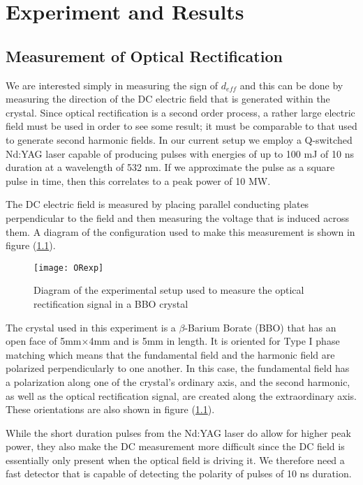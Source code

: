 \chapter{Experiment and Results}

\section{Measurement of Optical Rectification}

We are interested simply in measuring the sign of $d_{eff}$ and
this can be done by measuring the direction of the DC electric
field that is generated within the crystal.  Since optical
rectification is a second order process, a rather large electric
field must be used in order to see some result; it must be
comparable to that used to generate second harmonic fields.  In
our current setup we employ a Q-switched Nd:YAG laser capable of
producing pulses with energies of up to 100 mJ of 10 ns duration
at a wavelength of 532 nm. If we approximate the pulse as a square
pulse in time, then this correlates to a peak power of 10 MW.

The DC electric field is measured by placing parallel conducting
plates perpendicular to the field and then measuring the voltage
that is induced across them.  A diagram of the configuration used
to make this measurement is shown in figure (\ref{ORexp}).

\begin{figure}
\texttt{[image: ORexp]}
\caption[Optical rectification measurement apparatus]{Diagram of
the experimental setup used to measure the optical rectification
signal in a BBO crystal}
\label{ORexp}%
\end{figure}

The crystal used in this experiment is a $\beta$-Barium Borate
(BBO) that has an open face of 5mm$\times$4mm and is 5mm in
length. It is oriented for Type I phase matching which means that
the fundamental field and the harmonic field are polarized
perpendicularly to one another.  In this case, the fundamental
field has a polarization along one of the crystal's ordinary axis,
and the second harmonic, as well as the optical rectification
signal, are created along the extraordinary axis. These
orientations are also shown in figure (\ref{ORexp}).

While the short duration pulses from the Nd:YAG laser do allow for
higher peak power, they also make the DC measurement more
difficult since the DC field is essentially only present when the
optical field is driving it.  We therefore need a fast detector
that is capable of detecting the polarity of pulses of 10 ns
duration.

